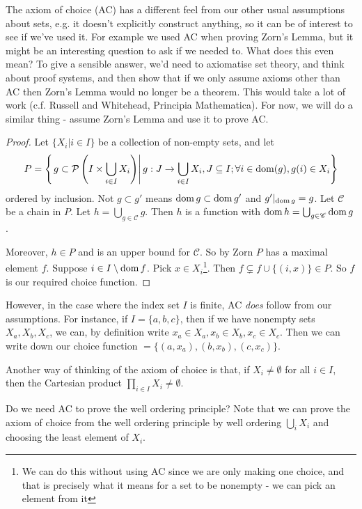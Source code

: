 \documentclass[10pt,a4paper]{article}
\begin{document}
The axiom of choice (AC) has a different feel from our other usual assumptions about sets, e.g. it doesn't explicitly construct anything, so it can be of interest to see if we've used it. For example we used AC when proving Zorn's Lemma, but it might be an interesting question to ask if we needed to. What does this even mean? To give a sensible answer, we'd need to axiomatise set theory, and think about proof systems, and then show that if we only assume axioms other than AC then Zorn's Lemma would no longer be a theorem. This would take a lot of work (c.f. Russell and Whitehead, Principia Mathematica). For now, we will do a similar thing - assume Zorn's Lemma and use it to prove AC.
\begin{proof}
Let $\{X_i | i \in I\}$ be a collection of non-empty sets, and let
\begin{align*}
P = \left\{\left.g \subset \mathcal{P}\left(I \times \bigcup_{i \in I} X_i \right) \right| g:J\to \bigcup_{i\in I}X_i, J \subseteq I; \forall i \in \operatorname{dom}(g), g(i) \in X_i\right\}
\end{align*}
ordered by inclusion. Not $g \subset g'$ means $\operatorname{dom} g \subset \operatorname{dom} g'$ and $g'|_{\operatorname{dom} g} = g$. Let $\mathscr{C}$ be a chain in $P$. Let $h = \bigcup_{g \in \mathscr{C}} g$. Then $h$ is a function with $\operatorname{dom} h = \bigcup_{g\in \mathscr{C}} \operatorname{dom} g$.

Moreover, $h \in P$ and is an upper bound for $\mathscr{C}$. So by Zorn $P$ has a maximal element $f$. Suppose $i \in I \setminus \operatorname{dom} f$. Pick $x \in X_i$\footnote{We can do this without using AC since we are only making one choice, and that is precisely what it means for a set to be nonempty - we can pick an element from it}. Then $f \subsetneq f \cup \{(i, x)\} \in P$. \contr
So $f$ is our required choice function.
\end{proof}

However, in the case where the index set $I$ is finite, AC \textit{does} follow from our assumptions. For instance, if $I = \{a,b,c\}$, then if we have nonempty sets $X_a, X_b, X_c$, we can, by definition write $x_a \in X_a, x_b \in X_b, x_c \in X_c$. Then we can write down our choice function $ = \{(a, x_a), (b, x_b), (c, x_c)\}$.

Another way of thinking of the axiom of choice is that, if $X_i \neq \emptyset$ for all $i \in I$, then the Cartesian product $\prod_{i \in I} X_i \neq \emptyset$.

Do we need AC to prove the well ordering principle? Note that we can prove the axiom of choice from the well ordering principle by well ordering $\bigcup_i X_i$ and choosing the least element of $X_i$.
\end{document}
